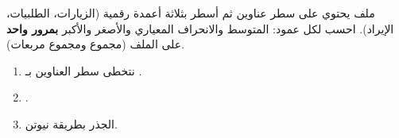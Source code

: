 \begin{statement}
ملف  يحتوي على سطر عناوين ثم أسطر بثلاثة أعمدة رقمية (الزيارات، الطلبيات، الإيراد). احسب لكل عمود: المتوسط والانحراف المعياري والأصغر والأكبر \textbf{بمرور واحد} على الملف (مجموع ومجموع مربعات).
\end{statement}
\begin{stepsbox}\begin{enumerate}
\item نتخطى سطر العناوين بـ .
\item {}.
\item الجذر بطريقة نيوتن.
\end{enumerate}\end{stepsbox}
